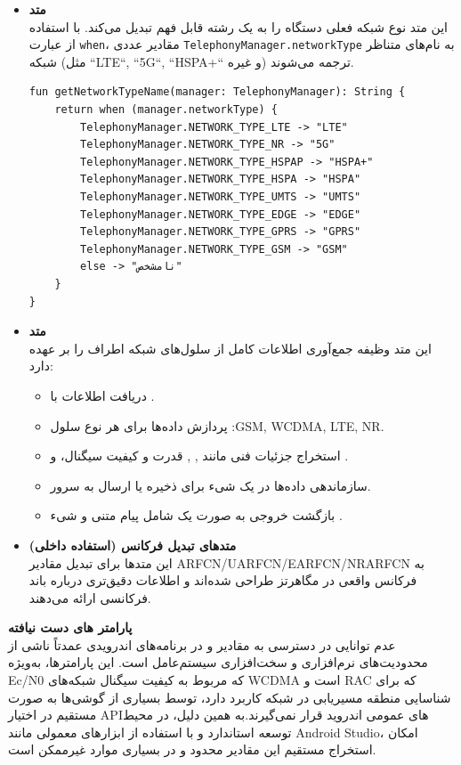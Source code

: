 \documentclass{report}
\begin{document}
\begin{itemize}
	\begin{itemize}
\item \textbf{متد }\\
		این متد نوع شبکه فعلی دستگاه را به یک رشته قابل فهم تبدیل می‌کند. با استفاده از عبارت \texttt{when}، مقادیر عددی \texttt{TelephonyManager.networkType} به نام‌های متناظر شبکه (مثل ``LTE``, ``5G``, ``HSPA+`` و غیره) ترجمه می‌شوند.
		
		\begin{lstlisting}[caption=متد getNetworkTypeName]
fun getNetworkTypeName(manager: TelephonyManager): String {
	return when (manager.networkType) {
		TelephonyManager.NETWORK_TYPE_LTE -> "LTE"
		TelephonyManager.NETWORK_TYPE_NR -> "5G"
		TelephonyManager.NETWORK_TYPE_HSPAP -> "HSPA+"
		TelephonyManager.NETWORK_TYPE_HSPA -> "HSPA"
		TelephonyManager.NETWORK_TYPE_UMTS -> "UMTS"
		TelephonyManager.NETWORK_TYPE_EDGE -> "EDGE"
		TelephonyManager.NETWORK_TYPE_GPRS -> "GPRS"
		TelephonyManager.NETWORK_TYPE_GSM -> "GSM"
		else -> "نامشخص"
	}
}
		\end{lstlisting}
		
\item \textbf{متد }\\
		این متد وظیفه جمع‌آوری اطلاعات کامل از سلول‌های شبکه اطراف را بر عهده دارد:
		
		\begin{itemize}
			\item دریافت اطلاعات با .
			\item پردازش داده‌ها برای هر نوع سلول :GSM, WCDMA, LTE, NR.
			\item استخراج جزئیات فنی مانند , , قدرت و کیفیت سیگنال،  و .
			\item سازماندهی داده‌ها در یک شیء  برای ذخیره یا ارسال به سرور.
			\item بازگشت خروجی به صورت یک  شامل پیام متنی و شیء .
		\end{itemize}
			
\item \textbf{متدهای تبدیل فرکانس (استفاده داخلی)}\\
		این متدها برای تبدیل مقادیر ARFCN/UARFCN/EARFCN/NRARFCN به فرکانس واقعی در مگاهرتز طراحی شده‌اند و اطلاعات دقیق‌تری درباره باند فرکانسی ارائه می‌دهند.
	
	\end{itemize}
\begin{note}
	\textbf{پارامتر های دست نیافته}\\
عدم توانایی در دسترسی به مقادیر  و در برنامه‌های اندرویدی عمدتاً ناشی از محدودیت‌های نرم‌افزاری و سخت‌افزاری سیستم‌عامل است. این پارامترها، به‌ویژه Ec/N0 که مربوط به کیفیت سیگنال شبکه‌های WCDMA است و RAC که برای شناسایی منطقه مسیریابی در شبکه کاربرد دارد، توسط بسیاری از گوشی‌ها به صورت مستقیم در اختیار APIهای عمومی اندروید قرار نمی‌گیرند.به همین دلیل، در محیط توسعه استاندارد و با استفاده از ابزارهای معمولی مانند Android Studio، امکان استخراج مستقیم این مقادیر محدود و در بسیاری موارد غیرممکن است.


\end{note}
\end{itemize}
\end{document}
